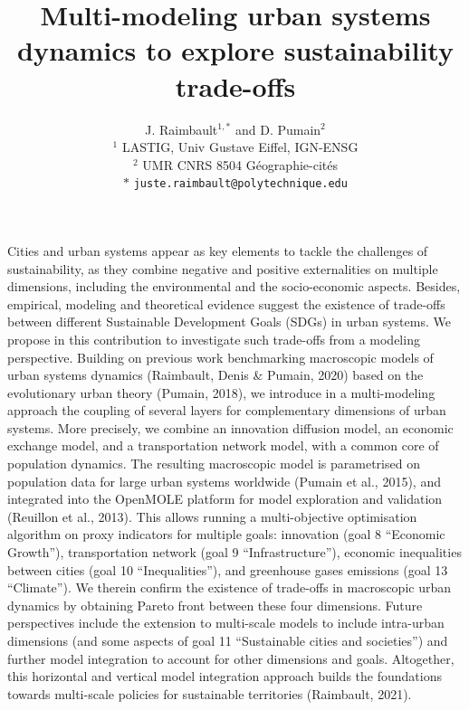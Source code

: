 \documentclass[12pt]{article}
\title{\vspace{-2cm}Multi-modeling urban systems dynamics to explore sustainability trade-offs}
\author{J. Raimbault$^{1,\ast}$ and D. Pumain$^2$\\
$^1$ LASTIG, Univ Gustave Eiffel, IGN-ENSG\\
$^2$ UMR CNRS 8504 G{\'e}ographie-cit{\'e}s\\
$\ast$ \texttt{juste.raimbault@polytechnique.edu}
}
\date{}
\begin{document}

\maketitle



\noindent

Cities and urban systems appear as key elements to tackle the challenges of sustainability, as they combine negative and positive externalities on multiple dimensions, including the environmental and the socio-economic aspects. Besides, empirical, modeling and theoretical evidence suggest the existence of trade-offs between different Sustainable Development Goals (SDGs) in urban systems. We propose in this contribution to investigate such trade-offs from a modeling perspective. Building on previous work benchmarking macroscopic models of urban systems dynamics (Raimbault, Denis \& Pumain, 2020) based on the evolutionary urban theory (Pumain, 2018), we introduce in a multi-modeling approach the coupling of several layers for complementary dimensions of urban systems. More precisely, we combine an innovation diffusion model, an economic exchange model, and a transportation network model, with a common core of population dynamics. The resulting macroscopic model is parametrised on population data for large urban systems worldwide (Pumain et al., 2015), and integrated into the OpenMOLE platform for model exploration and validation (Reuillon et al., 2013). This allows running a multi-objective optimisation algorithm on proxy indicators for multiple goals: innovation (goal 8 ``Economic Growth''), transportation network (goal 9 ``Infrastructure''), economic inequalities between cities (goal 10 ``Inequalities''), and greenhouse gases emissions (goal 13 ``Climate''). We therein confirm the existence of trade-offs in macroscopic urban dynamics by obtaining Pareto front between these four dimensions. Future perspectives include the extension to multi-scale models to include intra-urban dimensions (and some aspects of goal 11 ``Sustainable cities and societies'') and further model integration to account for other dimensions and goals. Altogether, this horizontal and vertical model integration approach builds the foundations towards multi-scale policies for sustainable territories (Raimbault, 2021).
\end{document}

